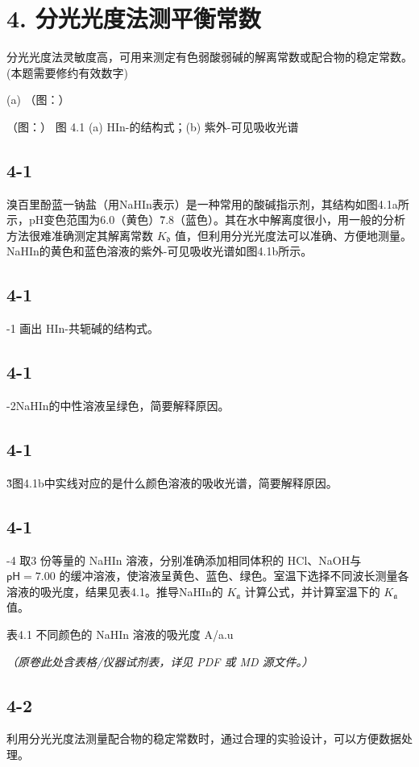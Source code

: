 \section*{4. 分光光度法测平衡常数}
分光光度法灵敏度高，可用来测定有色弱酸弱碱的解离常数或配合物的稳定常数。(本题需要修约有效数字)

(a)
（图：）

（图：）
图 4.1 (a) HIn-的结构式；(b) 紫外-可见吸收光谱

\subsection*{4-1}
溴百里酚蓝一钠盐（用NaHIn表示）是一种常用的酸碱指示剂，其结构如图4.1a所示，pH变色范围为6.0（黄色）\~7.8（蓝色）。其在水中解离度很小，用一般的分析方法很难准确测定其解离常数 $K _ { \mathfrak { d } }$ 值，但利用分光光度法可以准确、方便地测量。NaHIn的黄色和蓝色溶液的紫外-可见吸收光谱如图4.1b所示。

\subsection*{4-1}
-1 画出 HIn-共轭碱的结构式。

\subsection*{4-1}
-2NaHIn的中性溶液呈绿色，简要解释原因。

\subsection*{4-1}
\~3图4.1b中实线对应的是什么颜色溶液的吸收光谱，简要解释原因。

\subsection*{4-1}
-4 取3 份等量的 NaHIn 溶液，分别准确添加相同体积的 HCl、NaOH与 $\mathsf { p H } = 7 . 0 0$ 的缓冲溶液，使溶液呈黄色、蓝色、绿色。室温下选择不同波长测量各溶液的吸光度，结果见表4.1。推导NaHIn的 $K _ { \mathfrak { a } }$ 计算公式，并计算室温下的 $K _ { \mathfrak { a } }$ 值。

表4.1 不同颜色的 NaHIn 溶液的吸光度 A/a.u

\textit{（原卷此处含表格/仪器试剂表，详见 PDF 或 MD 源文件。）}

\subsection*{4-2}
利用分光光度法测量配合物的稳定常数时，通过合理的实验设计，可以方便数据处理。

